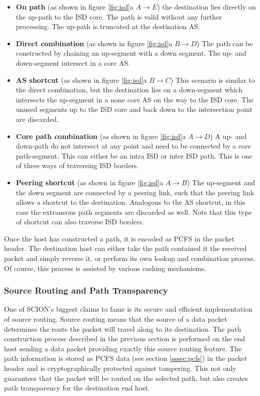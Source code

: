 \documentclass[../eva1_scion.tex]{subfiles}
\begin{document}
    \begin{itemize}
        \item \textbf{On path} (as shown in figure \ref{fig:isd}a $A \rightarrow E$) the destination lies directly on the up-path to the ISD core. The path is valid without any further processing. The up-path is truncated at the destination AS.
        \item \textbf{Direct combination} (as shown in figure \ref{fig:isd}a $B \rightarrow D$) The path can be constructed by chaining an up-segment with a down segment. The up- and down-segment intersect in a core AS.
        \item \textbf{AS shortcut} (as shown in figure \ref{fig:isd}a $B \rightarrow C$) This scenario is similar to the direct combination, but the destination lies on a down-segment which intersects the up-segment in a none core AS on the way to the ISD core. The unused segments up to the ISD core and back down to the intersection point are discarded.
        \item \textbf{Core path combination} (as shown in figure \ref{fig:isd}a $A \rightarrow D$) A up- and down-path do not intersect at any point and need to be connected by a core path-segment. This can either be an intra ISD or inter ISD path. This is one of three ways of traversing ISD borders.
        \item \textbf{Peering shortcut} (as shown in figure \ref{fig:isd}a $A \rightarrow B$) The up-segment and the down segment are connected by a peering link, such that the peering link allows a shortcut to the destination. Analogous to the AS shortcut, in this case the extraneous path segments are discarded as well. Note that this type of shortcut can also traverse ISD borders.
    \end{itemize}

    Once the host has constructed a path, it is encoded as PCFS in the packet header. The destination host can either take the path contained it the received packet and simply reverse it, or perform its own lookup and combination process. Of course, this process is assisted by various cashing mechanisms.

    \subsubsection{Source Routing and Path Transparency} \label{sssec:source_routing}
    One of SCION's biggest claims to fame is its secure and efficient implementation of source routing. Source routing means that the source of a data packet determines the route the packet will travel along to its destination. The path construction process described in the previous section is performed on the end host sending a data packet providing exactly this source routing feature. The path information is stored as PCFS data (see section \ref{sssec:pcfs}) in the packet header and is cryptographically protected against tampering. This not only guarantees that the packet will be routed on the selected path, but also creates path transparency for the destination end host.
\end{document}
